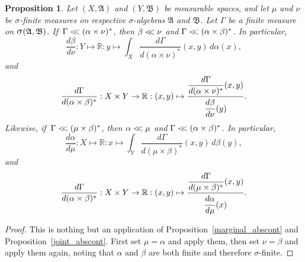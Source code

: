 \documentclass[
twoside=true,
paper=letter,
fontsize=9pt,
pagesize=auto,
leqno,
openany,
headsepline,
overfullrule,
]{scrbook}
\theoremstyle{plain}
\theoremstyle{plain}
\newtheorem{prop}[thm]{Proposition}
\theoremstyle{definition}
\theoremstyle{bfnoteitalic}
\theoremstyle{bfnoteroman}
\newcommand{\sigalg}[1]{\mathfrak{#1}}
\newcommand{\sagb}{\mathop{\hbox{\large{$\sigma$}}}\nolimits}
\newcommand{\textsigma}{\hbox{\large{$\sigma$}}\kern-1pt}
\newcommand{\R}{\mathbb{R}}
\newcommand{\sigmaalgebra}{\sigalg{A}}
\newcommand{\sigmaalgebraii}{\sigalg{B}}
\newcommand{\productsig}[2]{\sagb(#1,#2)}
\newcommand{\lilstrut}{\vphantom{\bigl(}}
\newcommand{\measurespace}{X}
\newcommand{\measurespaceii}{Y}
\newcommand{\mspaceelt}{x}
\newcommand{\mspaceeltii}{y}
\newcommand{\abscont}{\mathrel{< \kern-3.5pt <}}
\newcommand{\measure}{\mu}
\newcommand{\measmu}{\mu}
\newcommand{\measureii}{\nu}
\newcommand{\measnu}{\nu}
\newcommand{\joint}{\Gamma}%
\newcommand{\measonprod}{\Gamma}%
\newcommand{\marginalone}{\alpha}%
\newcommand{\marginaltwo}{\beta}%
\begin{document}
\begin{prop}\label{mixed_abscont}
Let
$(\measurespace, \sigmaalgebra)$
and
$(\measurespaceii, \sigmaalgebraii)$
be measurable spaces, and let $\measure$ and $\measureii$
be \textsigma-finite measures on  respective \textsigma-algebras
$\sigmaalgebra$ and $\sigmaalgebraii$.
Let $\measonprod$ be a finite measure on
$\productsig{\sigmaalgebra}{\sigmaalgebraii}$.
If\,
$\measonprod \abscont (\marginalone\times\measnu)^*$, then
$\marginaltwo\abscont\measnu$ and
$\measonprod\abscont(\marginalone\times\marginaltwo)^*$. In particular,
\[
\frac{d\marginaltwo}{d\measnu}
: \measurespaceii \mapsto\R
:\mspaceeltii\mapsto
\int_\measurespace
\dfrac{d\measonprod}{d(\marginalone\times\measnu)^*}(\mspaceelt,\mspaceeltii)
\, d\marginalone(\mspaceelt),
\]
and
\[
\frac{d\measonprod}{d(\marginalone\times\marginaltwo)^*}
: \measurespace\times\measurespaceii
\to \R
: (\mspaceelt,\mspaceeltii)\mapsto
\frac{\dfrac{d\measonprod}{d(\marginalone\times\measnu)^*}
(\mspaceelt,\mspaceeltii)}
{\dfrac{d\marginaltwo\lilstrut}{d\measnu}(\mspaceeltii)}.
\]
Likewise,
if\,
$\measonprod \abscont (\measmu\times\marginaltwo)^*$, then
$\marginalone\abscont\measmu$ and
$\measonprod\abscont(\marginalone\times\marginaltwo)^*$. In particular,
\[
\frac{d\marginalone}{d\measmu}
: \measurespace \mapsto\R
:\mspaceelt\mapsto
\int_\measurespaceii
\dfrac{d\measonprod}{d(\measmu\times\marginaltwo)^*}(\mspaceelt,\mspaceeltii)
\, d\marginaltwo(\mspaceeltii),
\]
and
\[
\frac{d\measonprod}{d(\marginalone\times\marginaltwo)^*}
: \measurespace\times\measurespaceii
\to \R
: (\mspaceelt,\mspaceeltii)\mapsto
\frac{\dfrac{d\joint}{d(\measmu\times\marginaltwo)^*}
(\mspaceelt,\mspaceeltii)}
{\dfrac{d\marginalone\lilstrut}{d\measmu}(\mspaceelt)}.
\]
\end{prop}


\begin{proof}
This is nothing but an application of Proposition~\ref{marginal_abscont} and Proposition~\ref{joint_abscont}. First set $\measmu=\marginalone$ and apply them, then set $\measnu=\marginaltwo$ and apply them again, noting that $\marginalone$ and $\marginaltwo$ are both finite and therefore \textsigma\hyp{}finite.
\end{proof}
\end{document}
